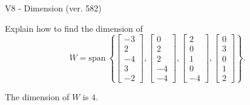 \begin{exercise}
  \begin{exerciseTitle}V8 - Dimension (ver. 582)\end{exerciseTitle}
  \begin{exerciseStatement}
    Explain how to find the dimension of 
\[W=\mathrm{span}\ \left\{\left[\begin{array}{r}
-3 \\
2 \\
-4 \\
3 \\
-2
\end{array}\right] , \left[\begin{array}{r}
0 \\
2 \\
2 \\
-4 \\
-4
\end{array}\right] , \left[\begin{array}{r}
2 \\
0 \\
1 \\
0 \\
-4
\end{array}\right] , \left[\begin{array}{r}
0 \\
3 \\
0 \\
1 \\
2
\end{array}\right]\right\}.\]



  \end{exerciseStatement}
  \begin{exerciseAnswer}
   The dimension of \(W\) is  \(4\).
  


  \end{exerciseAnswer}
\end{exercise}